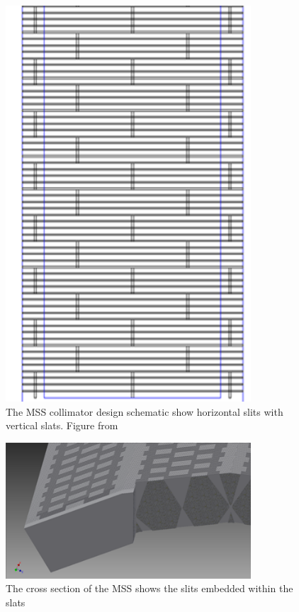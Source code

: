 \begin{figure}[!t]
\centering
\includegraphics[angle=90,origin=c,width=3.6in]{figures/Collimator_Schema.png}

    \caption{The \acrshort{MSS} collimator design schematic show horizontal slits with vertical slats. Figure from \cite{8069508}} \label{fig:MSSColl}
\end{figure}

\begin{figure}[!t]
\centering
\includegraphics[width=3.6in]{figures/collimator.png}

    \caption{The cross section of the \acrshort{MSS} shows the slits embedded within the slats} \label{fig:MSSslit}
\end{figure}


